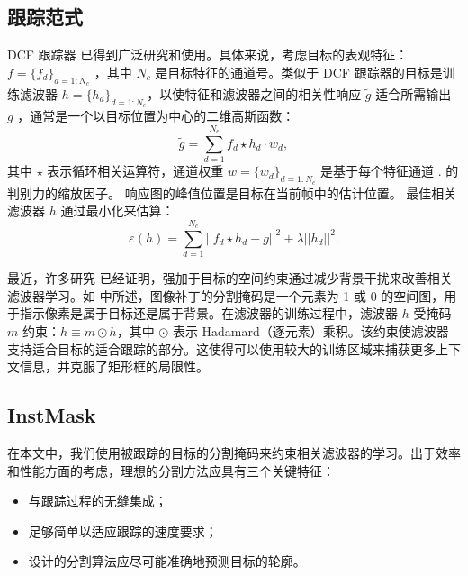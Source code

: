 \subsection{跟踪范式}
DCF 跟踪器 \cite{Danelljan2014AccurateSE, henriques2014high-speed, Li2014ASA} 已得到广泛研究和使用。具体来说，考虑目标的表观特征：$f=\{f_d\}_{d=1:N_c}$ ，其中 $N_c$ 是目标特征的通道号。类似于 DCF 跟踪器的目标是训练滤波器 $h=\{h_d\}_{d=1:N_c}$，以使特征和滤波器之间的相关性响应 $\tilde{g}$ 适合所需输出 $g$ ，通常是一个以目标位置为中心的二维高斯函数： 
\begin{equation} \label{eq:dcf}
\tilde{g}=\sum_{d=1}^{N_c}f_d \star h_d \cdot w_d,
\end{equation}
其中 $\star$ 表示循环相关运算符，通道权重 $w = \{w_d\}_{d=1:N_c}$ 是基于每个特征通道 \cite{Lukezic2017DiscriminativeCF}.
的判别力的缩放因子。
响应图的峰值位置是目标在当前帧中的估计位置。
最佳相关滤波器 $h$ 通过最小化来估算：
\begin{equation}
\varepsilon(h) = \sum_{d=1}^{N_c}||f_d \star h_d - g||^2+\lambda||h_d||^2.
\end{equation}

最近，许多研究 \cite{Danelljan2015LearningSR, Lukezic2017DiscriminativeCF} 已经证明，强加于目标的空间约束通过减少背景干扰来改善相关滤波器学习。如 \cite{Lukezic2017DiscriminativeCF}中所述，图像补丁的分割掩码是一个元素为 1 或 0 的空间图，用于指示像素是属于目标还是属于背景。在滤波器的训练过程中，滤波器 $h$ 受掩码 $m$ 约束：$h \equiv m \odot h$，其中 $\odot$ 表示 Hadamard（逐元素）乘积。该约束使滤波器支持适合目标的适合跟踪的部分。这使得可以使用较大的训练区域来捕获更多上下文信息，并克服了矩形框的局限性。

\subsection{InstMask}
\label{sec:InstMask}
在本文中，我们使用被跟踪的目标的分割掩码来约束相关滤波器的学习。出于效率和性能方面的考虑，理想的分割方法应具有三个关键特征：

\begin{itemize}
\item 与跟踪过程的无缝集成；
\item 足够简单以适应跟踪的速度要求；
\item 设计的分割算法应尽可能准确地预测目标的轮廓。
\end{itemize}

